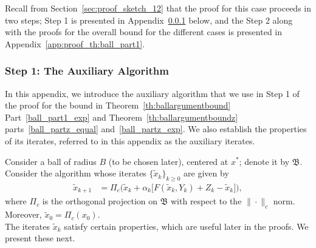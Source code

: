 \documentclass{article}
\begin{document}
Recall from Section~\ref{sec:proof_sketch_12} that the proof for this case proceeds in two steps; Step 1 is presented in Appendix~\ref{app:auxalgo} below, and the Step 2 along with the proofs for the overall bound for the different cases is presented in  Appendix~\ref{app:proof_th:ball_part1}.

\subsubsection{Step 1: The Auxiliary Algorithm}\label{app:auxalgo}
In this appendix, we introduce the auxiliary algorithm that we use in Step 1 of the proof for the bound in Theorem~\ref{th:ballargumentbound} Part~\ref{ball_part1_exp} and Theorem~\ref{th:ballargumentboundz} parts~\ref{ball_partz_equal} and~\ref{ball_partz_exp}. We also establish the properties of its iterates, referred to in this appendix as the auxiliary iterates. 

Consider a ball of radius $B$ (to be chosen later), centered at $x^*$; denote it by $\mathfrak B$. Consider the algorithm whose iterates $\{\tilde{x}_k\}_{k\geq 0}$ are given by
\begin{align*}
    \tilde{x}_{k+1} &= \Pi_c\Big( \tilde{x}_k + \alpha_k \big[ F(\tilde{x}_k, Y_k) + Z_k - \tilde{x}_k \big] \Big), 
\end{align*}
where $\Pi_c$ is the orthogonal projection on $\mathfrak B$ with respect to the $\|\cdot\|_c$ norm. Moreover, $\tilde{x}_0 = \Pi_c(x_0)$. \\

The iterates $\tilde{x}_k$ satisfy certain properties, which are useful later in the proofs. We present these next.
\end{document}
